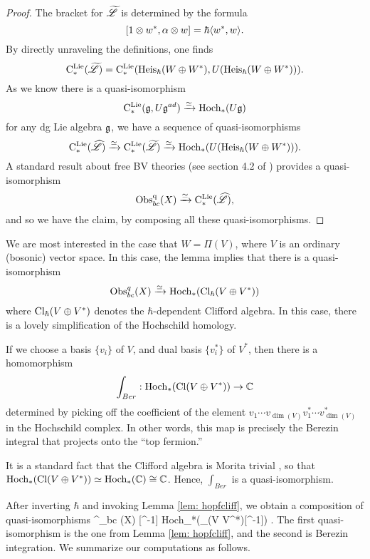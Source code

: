\begin{proof}
The bracket for $\widetilde{\mathscr L}$ is determined by the formula
\[
[1 \otimes w^* , \alpha \otimes w] = \hbar \langle w^*, w\rangle .
\]
By directly unraveling the definitions, one finds
\[
{\rm C}^{\rm Lie}_*(\widetilde{\mathscr L}) = {\rm C}^{\rm Lie}_*({\rm Heis}_\hbar(W \oplus W^*), U({\rm Heis}_\hbar(W \oplus W^*))).
\]
As we know there is a quasi-isomorphism
\[
{\rm C}^{\rm Lie}_*(\mathfrak g, U\mathfrak g^{ad}) \xrightarrow{\simeq} {\rm Hoch}_*(U\mathfrak g)
\]
for any dg Lie algebra $\mathfrak g$,
we have a sequence of quasi-isomorphisms
\[
{\rm C}^{\rm Lie}_*(\widehat{\mathscr L}) \xrightarrow{\simeq} {\rm C}^{\rm Lie}_*(\widetilde{\mathscr L}) \xrightarrow{\simeq} {\rm Hoch}_*(U({\rm Heis}_\hbar(W \oplus W^*))).
\]
A standard result about free BV theories (see section 4.2 of \cite{CG1}) provides a quasi-isomorphism
\[
{\rm Obs}^{{\rm q}}_{bc} (X) \xrightarrow{\simeq} {\rm C}^{\rm Lie}_*(\widehat{\mathscr L}),
\] 
and so we have the claim, by composing all these quasi-isomorphisms.
\end{proof}

We are most interested in the case that $W = \Pi(V)$, where $V$ is an ordinary (bosonic) vector space. 
In this case, the lemma implies that there is a quasi-isomorphism
\[
{\rm Obs}^q_{bc}(X) \xrightarrow{\simeq} {\rm Hoch}_*({\rm Cl}_\hbar(V \oplus V^*)) 
\]
where ${\rm Cl}_\hbar(V \oplus V^*)$ denotes the $\hbar$-dependent Clifford algebra. 
In this case, there is a lovely simplification of the Hochschild homology. 

If we choose a basis $\{v_i\}$ of $V$, and dual basis $\{v_i^*\}$ of $V^*$, then there is a homomorphism 
\[
\int_{Ber} : {\rm Hoch}_* ({\rm Cl} (V \oplus V^*)) \to \mathbb C 
\]
determined by picking off the coefficient of the element $v_1 \cdots v_{\dim(V)} v_1^* \cdots v^*_{\dim(V)}$ in the Hochschild complex. 
In other words, this map is precisely the Berezin integral that projects onto the ``top fermion.'' 

It is a standard fact that the Clifford algebra is Morita trivial \cite{KasselCliff}, so that ${\rm Hoch}_*({\rm Cl}(V \oplus V^*)) \simeq {\rm Hoch}_* (\mathbb C) \cong \mathbb C$.
Hence, $\int_{Ber}$ is a quasi-isomorphism. 

After inverting $\hbar$ and invoking Lemma \ref{lem: hopfcliff}, we obtain a composition of quasi-isomorphisms 
\beqn\label{hopfcliffquasi}
\Obs^\q_{bc} (X) [\hbar^{-1}] \xto{\simeq} {\rm Hoch}_*(\Cl_\hbar (V \oplus V^*)[\hbar^{-1}]) \xto{\simeq} .
\eeqn
{}
The first quasi-isomorphism is the one from Lemma \ref{lem: hopfcliff}, and the second is Berezin integration. 
We summarize our computations as follows.

